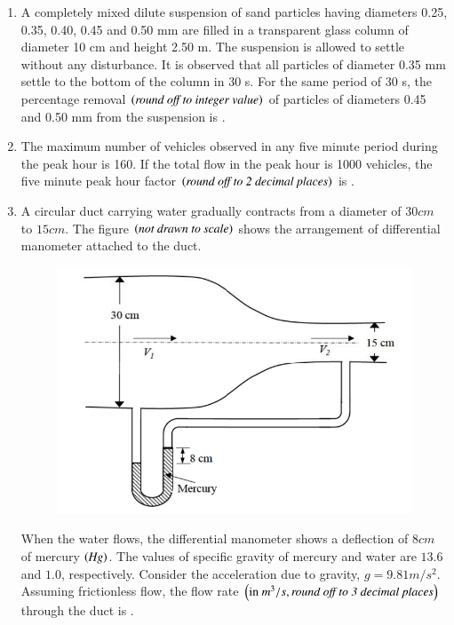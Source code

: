 \documentclass[journal,12pt,onecolumn]{IEEEtran}
\theoremstyle{remark}
\begin{document}
\begin{enumerate}
\hfill{}

\item A completely mixed dilute suspension of sand particles having diameters 0.25, 0.35, 0.40, 0.45 and 0.50 mm are filled in a transparent glass column of diameter 10 cm and height 2.50 m. The suspension is allowed to settle without any disturbance. It is observed that all particles of diameter 0.35 mm settle to the bottom of the column in 30 s. For the same period of 30 s, the percentage removal $\left(\textit{round off to integer value}\right)$ of particles of diameters 0.45 and 0.50 mm from the suspension is \underline{\hspace{3cm}}.

\hfill{}

\item The maximum number of vehicles observed in any five minute period during the peak hour is 160. If the total flow in the peak hour is 1000 vehicles, the five minute peak hour factor $\left(\textit{round off to 2 decimal places}\right)$ is \underline{\hspace{3cm}}.

\hfill{}

\item A circular duct carrying water gradually contracts from a diameter of $30cm$ to $15cm$. The figure $\left(\textit{not drawn to scale}\right)$ shows the arrangement of differential manometer attached to the duct.

\begin{figure}[H]
    \centering
    \includegraphics[width=0.5\linewidth]{figs/q22.png}
    \caption*{}
    \label{fig:Q.22}
\end{figure}
When the water flows, the differential manometer shows a deflection of $8cm$ of mercury $\left(\textit{Hg}\right)$. The values of specific gravity of mercury and water are $13.6$ and $1.0$, respectively. Consider the acceleration due to gravity, $g=9.81m/s^2$. Assuming frictionless flow, the flow rate $\left(\text{in } m^3/s,\textit{round off to 3 decimal places}\right)$ through the duct is \underline{\hspace{2cm}}.


\end{enumerate}
\end{document}
